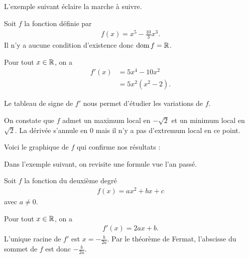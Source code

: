 \documentclass[main.tex]{subfiles}
\begin{document}
L'exemple suivant éclaire la marche à suivre.

\begin{example}
     Soit $f$ la fonction définie par
     \begin{align}
         f(x) = x^5 - \frac {10} 3 x^3.
     \end{align}
     Il n'y a aucune condition d'existence donc $\operatorname{dom} f = \mathbb{R}$.

     Pour tout $x \in \mathbb{R}$, on a
     \begin{align}
         f'(x)
         &= 5 x^4 - 10 x^2\\
         &= 5 x^2 (x^2 - 2).
     \end{align}

     Le tableau de signe de $f'$ nous permet d'étudier les variations de $f$.


    On constate que $f$ admet un maximum local en $- \sqrt 2$ et un minimum local en $ \sqrt 2$.
    La dérivée s'annule en $0$ mais il n'y a pas d'extremum local en ce point.

    Voici le graphique de $f$ qui confirme nos résultats :

    \begin{plot}{0.5}{-5}{-5}{5}{5}
    \end{plot}
\end{example}

Dans l'exemple suivant, on revisite une formule vue l'an passé.

\begin{example}

    Soit $f$ la fonction du deuxième degré
    \begin{align}
        f(x) = a x^2 + bx + c
    \end{align}
    avec $a \neq 0$.

    Pour tout $x \in \mathbb{R}$, on a
    \begin{align}
        f'(x) = 2ax + b.
    \end{align}
    L'unique racine de $f'$ est $x = - \frac{b}{2a}$.
    Par le théorème de Fermat, l'abscisse du sommet de $f$ est donc $- \frac{b}{2a}$.
\end{example}
\end{document}
